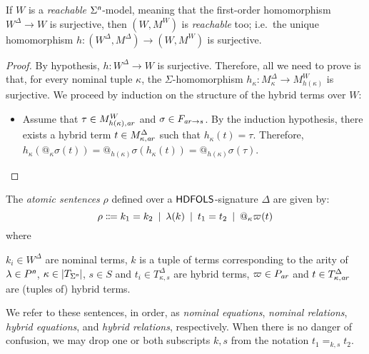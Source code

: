 \documentclass[a4paper,UKenglish,cleveref,autoref]{lipics-v2019}
\begin{document}
\begin{proposition} 
  \label{proposition:tm-reachability}
  If\/ $W$ is a \emph{reachable} $\Sigma^{\text{\normalfont\sffamily\itshape n}}$-model, meaning that the first-order homomorphism $W^\Delta \to W$ is surjective, then $(W, M^W)$ is \emph{reachable} too; i.e.\ the unique homomorphism $h \colon (W^\Delta,M^\Delta) \to (W, M^W)$ is surjective.
\end{proposition}
\begin{proof}
  By hypothesis, $h \colon W^\Delta \to W$ is surjective.
  Therefore, all we need to prove is that, for every nominal tuple $\kappa$, the $\Sigma$-homomorphism $h_{\kappa} \colon M^{\Delta}_{\kappa} \to M^W _{h(\kappa)}$ is surjective.
  We proceed by induction on the structure of the hybrid terms over $W$:
  \begin{itemize}
  
  \item Assume that $\tau \in M^W _{h(\kappa),\mathit{a\mkern -1mu r}}$ and $\sigma \in F_{\mathit{a\mkern -1mu r} \to s}$.
    By the induction hypothesis, there exists a hybrid term $t \in M^{\Delta}_{\kappa,\mathit{a\mkern -1mu r}}$ such that $h_{\kappa}(t) = \tau$.
    Therefore, $h_{\kappa}(@_\kappa\sigma(t)) = @_{h(\kappa)}\sigma(h_{\kappa}(t)) = @_{h(\kappa)}\sigma(\tau)$.
    \qedhere
  \end{itemize}
\end{proof}

The \emph{atomic sentences} $\rho$ defined over a ${\mathsf{HDFOLS}}$-signature $\Delta$ are given by:
\[
  \rho \Coloneqq
  k_{1} = k_{2} \enspace|\enspace
   \lambda(k) \enspace|\enspace
  t_{1} = t_{2} \enspace|\enspace
  @_\kappa \varpi(t) 
\]
 where 
 \begin{inparenum}
  \inparitem  $ k_{i} \in W^\Delta $ are nominal terms,
  \inparitem  $ k $ is a tuple of terms corresponding to the arity of $\lambda \in P^{\text{\normalfont\sffamily\itshape n}}$,
  \inparitem $\kappa\in |T_{\Sigma^{\text{\normalfont\sffamily\itshape n}}}|$, $s\in S$ and $t_{i} \in T^{\Delta}_{\kappa, s}$ are hybrid terms,
  \inparitem $\varpi \in P_{\mathit{a\mkern -1mu r}}$ and $t \in T^{\Delta}_{\kappa,\mathit{a\mkern -1mu r}}$ are (tuples of) hybrid terms.
\end{inparenum}
We refer to these sentences, in order, as \emph{nominal equations}, \emph{nominal relations}, \emph{hybrid equations}, and \emph{hybrid relations}, respectively.
When there is no danger of confusion, we may drop one or both subscripts $k, s$ from the notation $t_{1} =_{k, s} t_{2}$.
\end{document}
